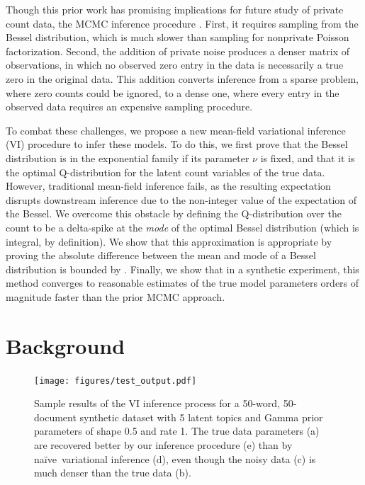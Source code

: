 \documentclass{article}
\newcommand{\naive}{na\"{i}ve}
\begin{document}
  Though this prior work has promising implications for future study of private
  count data, the MCMC inference procedure . First, it requires sampling from the Bessel
  distribution, which is much slower than sampling for nonprivate Poisson
  factorization. Second, the addition of private noise produces a denser matrix
  of observations, in which no observed zero entry in the data is necessarily a
  true zero in the original data. This addition converts inference from a sparse
  problem, where zero counts could be ignored, to a dense one, where every entry
  in the observed data requires an expensive sampling procedure.
  
  To combat these challenges, we propose a new mean-field variational inference
  (VI) procedure to infer these models. To do this, we first prove that the
  Bessel distribution is in the exponential family if its parameter $\nu$ is
  fixed, and that it is the optimal Q-distribution for the latent count
  variables of the true data. However, traditional mean-field inference fails,
  as the resulting expectation disrupts downstream inference due to the
  non-integer value of the expectation of the Bessel. We overcome this obstacle
  by defining the Q-distribution over the count to be a delta-spike at the
  \emph{mode} of the optimal Bessel distribution (which is integral, by
  definition). We show that this approximation is appropriate by proving the
  absolute difference between the mean and mode of a Bessel distribution is
  bounded by . Finally, we show that in a synthetic experiment, this method
  converges to reasonable estimates of the true model parameters orders of
  magnitude faster than the prior MCMC approach.

  \section{Background}

  \begin{figure}[t]
    \centering
    \texttt{[image: figures/test\_output.pdf]}
    \caption{Sample results of the VI inference process for a
     50-word, 50-document synthetic dataset with 5 latent topics and Gamma prior
     parameters of shape 0.5 and rate 1. The true data parameters (a) are
     recovered better by our inference procedure (e) than by \naive~variational
     inference (d), even though the noisy data (c) is much denser than the true
     data (b).}
    \label{fig:test_output}
  \end{figure}
\end{document}
